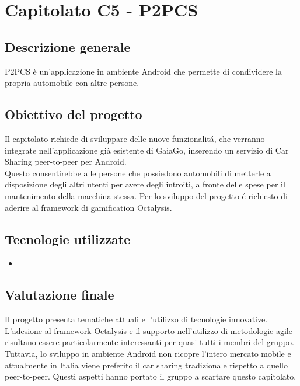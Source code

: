 \section{Capitolato C5 - P2PCS}\label{section:c5}

\subsection{Descrizione generale}
P2PCS è un'applicazione in ambiente Android che permette di condividere la propria automobile con altre persone.

\subsection{Obiettivo del progetto}
Il capitolato richiede di sviluppare delle nuove funzionalit\'a, che verranno integrate nell’applicazione già esistente di GaiaGo, inserendo un servizio di Car Sharing peer-to-peer per Android. \\Questo consentirebbe alle persone che possiedono automobili di metterle a disposizione degli altri utenti per avere degli introiti, a fronte delle spese per il mantenimento della macchina stessa. Per lo sviluppo del progetto \'e richiesto di aderire al framework di gamification Octalysis.

\subsection{Tecnologie utilizzate}
\begin{itemize}
	\item 
	
\end{itemize}
\subsection{Valutazione finale}
Il progetto presenta tematiche attuali e l'utilizzo di tecnologie innovative. L'adesione al framework Octalysis e il supporto nell’utilizzo di metodologie agile risultano essere particolarmente interessanti per quasi tutti i membri del gruppo. \\Tuttavia, lo sviluppo in ambiente Android non ricopre l'intero mercato mobile e attualmente in Italia viene preferito il car sharing tradizionale rispetto a quello peer-to-peer. Questi aspetti hanno portato il gruppo a scartare questo capitolato.

